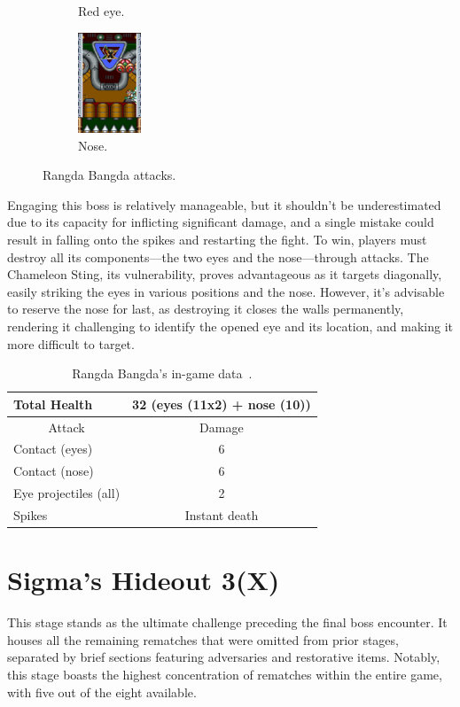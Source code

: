 \begin{figure}[htp]
\begin{subfigure}[t]{.5\linewidth}
		\caption{Red eye.}
	\end{subfigure}
	\begin{subfigure}{0.2\linewidth}
		\centering
		\includegraphics[height=3cm]{figures/X1/Sigma_stages/Rangda_nose.jpg}
		\caption{Nose.}
	\end{subfigure}
	\caption{Rangda Bangda attacks.}
\end{figure} 

Engaging this boss is relatively manageable, but it shouldn't be underestimated due to its capacity for inflicting significant damage, and a single mistake could result in falling onto the spikes and restarting the fight. To win, players must destroy all its components—the two eyes and the nose—through attacks. The Chameleon Sting, its vulnerability, proves advantageous as it targets diagonally, easily striking the eyes in various positions and the nose. However, it's advisable to reserve the nose for last, as destroying it closes the walls permanently, rendering it challenging to identify the opened eye and its location, and making it more difficult to target.

\begin{table}[htp]
	\centering
	\begin{tabular}[h]{l c}
		\toprule
		Total Health  & 32 (eyes (11x2) + nose (10))\\
		\midrule
		\multicolumn{1}{c}{Attack} & \multicolumn{1}{c}{Damage}\\
		Contact (eyes) & 6\\
		Contact (nose) & 6\\
		Eye projectiles (all) & 2\\
		Spikes & Instant death\\
		\bottomrule
	\end{tabular}
	\caption{Rangda Bangda's in-game data~\cite{wiki:Rangda_bangda}. }
\end{table}

\section{Sigma's Hideout 3(X)}
This stage stands as the ultimate challenge preceding the final boss encounter. It houses all the remaining rematches that were omitted from prior stages, separated by brief sections featuring adversaries and restorative items. Notably, this stage boasts the highest concentration of rematches within the entire game, with five out of the eight available.

